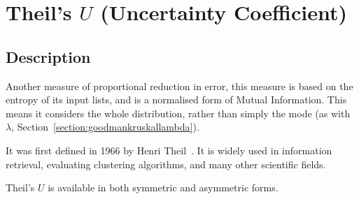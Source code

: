 \documentclass[11pt]{article}
\begin{document}
%
\section{Theil's $U$ (Uncertainty Coefficient)}
\label{section:theilu}
\subsection{Description}
Another measure of proportional reduction in error, this measure is based on the entropy of its input lists, and is a normalised form of Mutual Information.  This means it considers the whole distribution, rather than simply the mode (as with $\lambda$, Section~\ref{section:goodmankruskallambda}).  

It was first defined in 1966 by Henri Theil~\cite{theil1966applied}.  It is widely used in information retrieval, evaluating clustering algorithms, and many other scientific fields.

Theil's $U$ is available in both symmetric and asymmetric forms.


\end{document}
